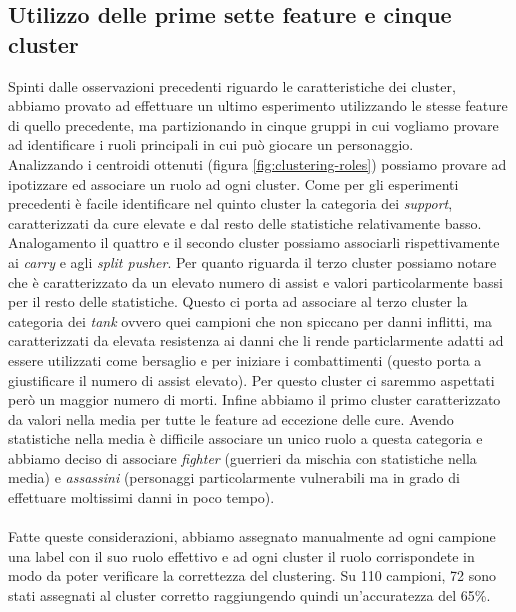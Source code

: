 \documentclass[a4paper,12pt,openany,oneside]{book}
\begin{document}
\subsection{Utilizzo delle prime sette feature e cinque cluster}
Spinti dalle osservazioni precedenti riguardo le caratteristiche dei cluster, abbiamo provato ad effettuare un ultimo esperimento utilizzando le stesse feature di quello precedente, ma partizionando in cinque gruppi in cui vogliamo provare ad identificare i ruoli principali in cui può giocare un personaggio.\\
Analizzando i centroidi ottenuti (figura \ref{fig:clustering-roles}) possiamo provare ad ipotizzare ed associare un ruolo ad ogni cluster. Come per gli esperimenti precedenti è facile identificare nel quinto cluster la categoria dei \textit{support}, caratterizzati da cure elevate e dal resto delle statistiche relativamente basso. Analogamento il quattro e il secondo cluster possiamo associarli rispettivamente ai \textit{carry} e agli \textit{split pusher}. Per quanto riguarda il terzo cluster possiamo notare che è caratterizzato da un elevato numero di assist e valori particolarmente bassi per il resto delle statistiche. Questo ci porta ad associare al terzo cluster la categoria dei \textit{tank} ovvero quei campioni che non spiccano per danni inflitti, ma caratterizzati da elevata resistenza ai danni che li rende particlarmente adatti ad essere utilizzati come bersaglio e per iniziare i combattimenti (questo porta a giustificare il numero di assist elevato). Per questo cluster ci saremmo aspettati però un maggior numero di morti. Infine abbiamo il primo cluster caratterizzato da valori nella media per tutte le feature ad eccezione delle cure. Avendo statistiche nella media è difficile associare un unico ruolo a questa categoria e abbiamo deciso di associare \textit{fighter} (guerrieri da mischia con statistiche nella media) e \textit{assassini} (personaggi particolarmente vulnerabili ma in grado di effettuare moltissimi danni in poco tempo).\\\\
Fatte queste considerazioni, abbiamo assegnato manualmente ad ogni campione una label con il suo ruolo effettivo e ad ogni cluster il ruolo corrispondete in modo da poter verificare la correttezza del clustering. Su 110 campioni, 72 sono stati assegnati al cluster corretto raggiungendo quindi un'accuratezza del 65\%.
\end{document}
